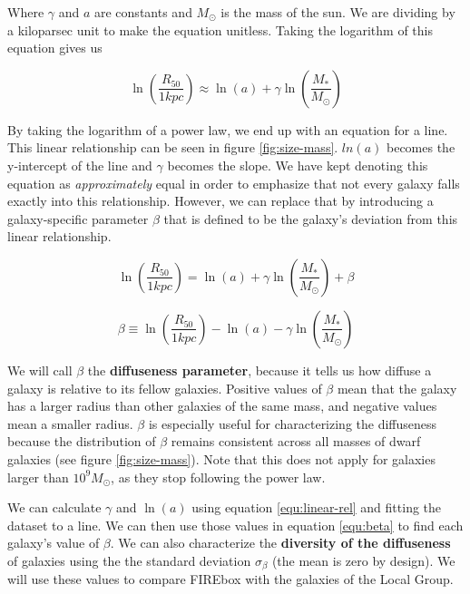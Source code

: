 Where $\gamma$ and $a$ are constants and $M_\odot$ is the mass of the sun. We are dividing by a kiloparsec unit to make the equation unitless. Taking the logarithm of this equation gives us

\begin{equation}
    \ln \left(
        \frac{R_{50}}{1 kpc}
    \right)
    \approx
    \ln(a)
    + \gamma \ln \left(
        \frac{M_*}{M_\odot}
    \right)
\end{equation} \label{equ:linear-rel}

By taking the logarithm of a power law, we end up with an equation for a line. This linear relationship can be seen in figure \ref{fig:size-mass}. $ln(a)$ becomes the y-intercept of the line and $\gamma$ becomes the slope. We have kept denoting this equation as \emph{approximately} equal in order to emphasize that not every galaxy falls exactly into this relationship. However, we can replace that by introducing a galaxy-specific parameter $\beta$ that is defined to be the galaxy's deviation from this linear relationship.

\begin{equation}
    \ln \left(
        \frac{R_{50}}{1 kpc}
    \right)
    =
    \ln(a)
    + \gamma \ln \left(
        \frac{M_*}{M_\odot}
    \right)
    + \beta
\end{equation}

\begin{equation}
    \beta
    \equiv
    \ln \left(
        \frac{R_{50}}{1 kpc}
    \right)
    -
    \ln(a)
    - \gamma \ln \left(
        \frac{M_*}{M_\odot}
    \right)
\end{equation} \label{equ:beta}

We will call $\beta$ the \textbf{diffuseness parameter}, because it tells us how diffuse a galaxy is relative to its fellow galaxies. Positive values of $\beta$ mean that the galaxy has a larger radius than other galaxies of the same mass, and negative values mean a smaller radius. $\beta$ is especially useful for characterizing the diffuseness because the distribution of $\beta$ remains consistent across all masses of dwarf galaxies (see figure \ref{fig:size-mass}). Note that this does not apply for galaxies larger than $10^9 M_\odot$, as they stop following the power law.

We can calculate $\gamma$ and $\ln(a)$ using equation \ref{equ:linear-rel} and fitting the dataset to a line. We can then use those values in equation \ref{equ:beta} to find each galaxy's value of $\beta$. We can also characterize the \textbf{diversity of the diffuseness} of galaxies using the the standard deviation $\sigma_\beta$ (the mean is zero by design). We will use these values to compare FIREbox with the galaxies of the Local Group.

